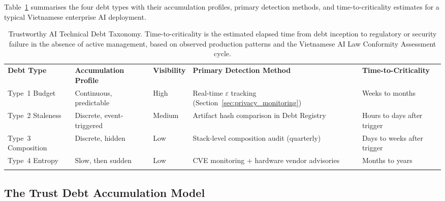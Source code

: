 Table~\ref{tab:debt-taxonomy} summarises the four debt types
with their accumulation profiles, primary detection methods,
and time-to-criticality estimates for a typical Vietnamese
enterprise AI deployment.

\begin{table}[ht]
\centering
\caption{Trustworthy AI Technical Debt Taxonomy.
  Time-to-criticality is the estimated elapsed time from
  debt inception to regulatory or security failure in the
  absence of active management, based on observed production
  patterns and the Vietnamese AI Law Conformity Assessment
  cycle.}
\label{tab:debt-taxonomy}
\small
\begin{tabular}{p{1.8cm}p{2.2cm}p{2.0cm}p{2.8cm}p{2.2cm}}
\hline\noalign{\smallskip}
\textbf{Debt Type}
  & \textbf{Accumulation Profile}
  & \textbf{Visibility}
  & \textbf{Primary Detection Method}
  & \textbf{Time-to-Criticality} \\
\noalign{\smallskip}\svhline\noalign{\smallskip}

Type~1 Budget
  & Continuous, predictable
  & \cellcolor{debtgreen!30} High
  & Real-time $\varepsilon$ tracking (Section~\ref{sec:privacy_monitoring})
  & Weeks to months \\[6pt]

Type~2 Staleness
  & Discrete, event-triggered
  & \cellcolor{debtamber!40} Medium
  & Artifact hash comparison in Debt Registry
  & Hours to days after trigger \\[6pt]

Type~3 Composition
  & Discrete, hidden
  & \cellcolor{debtred!30} Low
  & Stack-level composition audit (quarterly)
  & Days to weeks after trigger \\[6pt]

Type~4 Entropy
  & Slow, then sudden
  & \cellcolor{debtred!30} Low
  & CVE monitoring + hardware vendor advisories
  & Months to years \\

\noalign{\smallskip}\hline\noalign{\smallskip}
\end{tabular}
\end{table}

\subsection{The Trust Debt Accumulation Model}
\label{subsec:debt-accumulation}

